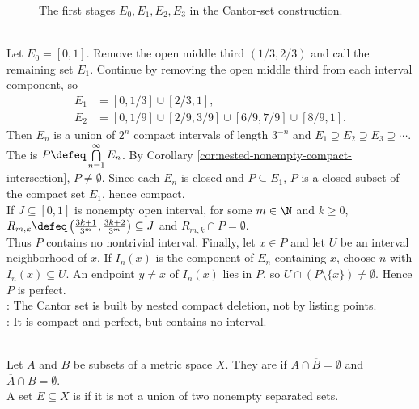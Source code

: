 \begin{figure}[H]
  \centering
  
  \caption{The first stages $E_0,E_1,E_2,E_3$ in the Cantor-set construction.}
  \label{fig:cantor-set-first-stages}
\end{figure}

\begin{example} \label{ex:cantor-set} \\
Let $E_0=[0,1]$. Remove the open middle third $(1/3,2/3)$ and call the remaining set $E_1$. Continue by removing the open middle third from each interval component, so
\begin{align}
E_1&=[0,1/3]\cup[2/3,1], \nonumber\\
E_2&=[0,1/9]\cup[2/9,3/9]\cup[6/9,7/9]\cup[8/9,1]. \nonumber
\end{align}
Then $E_n$ is a union of $2^n$ compact intervals of length $3^{-n}$ and $E_1\supseteq E_2\supseteq E_3\supseteq\cdots$.\\
The  is $P\defeq\bigcap\limits_{n=1}^{\infty}E_n$. By Corollary \ref{cor:nested-nonempty-compact-intersection}, $P\neq\emptyset$. Since each $E_n$ is closed and $P\subseteq E_1$, $P$ is a closed subset of the compact set $E_1$, hence compact.\\
If $J\subseteq[0,1]$ is nonempty open interval, for some $m\in\N$ and $k\geq0$, $R_{m,k}\defeq\left(\frac{3k+1}{3^m},\frac{3k+2}{3^m}\right)\subseteq J$ and $R_{m,k}\cap P=\emptyset$.\\
Thus $P$ contains no nontrivial interval. Finally, let $x\in P$ and let $U$ be an interval neighborhood of $x$. If $I_n(x)$ is the component of $E_n$ containing $x$, choose $n$ with $I_n(x)\subseteq U$. An endpoint $y\neq x$ of $I_n(x)$ lies in $P$, so $U\cap(P\setminus\{x\})\neq\emptyset$. Hence $P$ is perfect.\\
: The Cantor set is built by nested compact deletion, not by listing points.\\
: It is compact and perfect, but contains no interval.
\end{example}

\begin{definition} \label{def:separated-and-connected-sets} \\
Let $A$ and $B$ be subsets of a metric space $X$. They are  if $A\cap\overline{B}=\emptyset$ and $\overline{A}\cap B=\emptyset$.\\
A set $E\subseteq X$ is  if it is not a union of two nonempty separated sets.
\end{definition}

